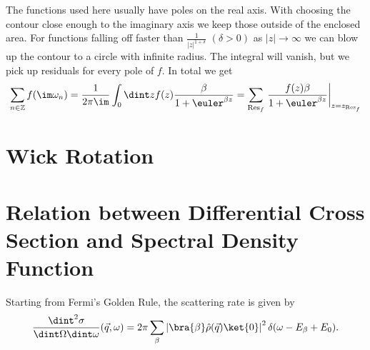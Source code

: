\documentclass[a4paper,12pt]{report}
\begin{document}
The functions used here usually have poles on the real axis. 
With choosing the contour close enough to the imaginary axis we keep those outside of the enclosed area.
For functions falling off faster than $\frac{1}{|z|^{1+\delta}}$ $(\delta>0)$ as $|z|\rightarrow \infty$ we can blow up the contour to a
circle with infinite radius. The integral will vanish, but we pick up residuals for every pole of $f$.
In total we get
\begin{equation}
 \sum_{n\in\mathbb{Z}} f(\im \omega_n) = \frac{1}{2\pi \im} \int_0 \dint z f(z)\frac{\beta}{1+\euler^{\beta z }} 
 = \sum_{\mathrm{Res}_f} \left. \frac{f(z)\beta}{1+\euler^{\beta z }}\right|_{z=z_{\mathrm{Res}_f}}
\end{equation}

\section{Wick Rotation}

\section{Relation between Differential Cross Section and Spectral Density Function}


Starting from Fermi's Golden Rule, the scattering rate is given by 
\begin{equation} \label{FGR}
 \frac{\dint^2 \sigma}{\dint \Omega \dint \omega}(\vec q, \omega) = 2\pi \sum_{\beta} \left| \bra{\beta} \hat \rho(\vec q) \ket{0}\right|^2 \delta(\omega - E_{\beta}+E_0).
\end{equation}



\end{document}
